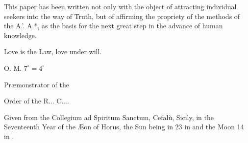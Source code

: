 This paper has been written not only with the object of attracting individual seekers into the way of Truth, but of affirming the propriety of the methods of the A.'. A.*, as the basis for the next great step in the advance of human knowledge.

Love is the Law, love under will.

{\raggedleft
O. M. $7^{\circ} = 4^{\square}$ \Argentium{}

Pr\ae{}monstrator of the

Order of the R... C....
\par}

Given from the Collegium ad Spiritum Sanctum, Cefal\`{u}, Sicily, in the Seventeenth Year of the \AE{}on of Horus, the Sun being in 23\textdegree{} in \virgo{} and the Moon 14\textdegree{} in \pisces{}.

